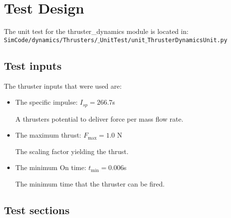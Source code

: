 \documentclass[]{BasiliskReportMemo}
\begin{document}
\section{Test Design}
The unit test for the thruster\_dynamics module is located in:\\

\noindent
{\tt SimCode/dynamics/Thrusters/$\_$UnitTest/unit$\_$ThrusterDynamicsUnit.py} \\

\subsection{Test inputs}

The thruster inputs that were used are:

\begin{itemize}
\item The specific impulse: $I_{sp} = 266.7$s 

A thrusters potential to deliver force per mass flow rate. 
\item The maximum thrust: $F_{\mathrm{max}} = 1.0$ N

The scaling factor yielding the thrust.
\item The minimum On time: $t_{\mathrm{min}} = 0.006$s

The minimum time that the thruster can be fired.
\end{itemize}

\subsection{Test sections}
\end{document}
